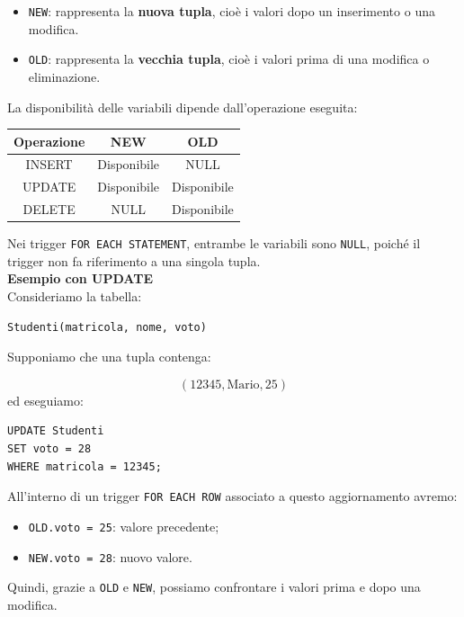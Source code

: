 \begin{itemize}
    \item \texttt{NEW}: rappresenta la \textbf{nuova tupla},
    cioè i valori dopo un inserimento o una modifica.

    \item \texttt{OLD}: rappresenta la \textbf{vecchia tupla},
    cioè i valori prima di una modifica o eliminazione.
\end{itemize}

\noindent
La disponibilità delle variabili dipende
dall'operazione eseguita:

\begin{center}
\begin{tabular}{|c|c|c|}
\hline
\textbf{Operazione} & \textbf{NEW} & \textbf{OLD} \\
\hline
INSERT & Disponibile & NULL \\
\hline
UPDATE & Disponibile & Disponibile \\
\hline
DELETE & NULL & Disponibile \\
\hline
\end{tabular}
\end{center}

\noindent
Nei trigger \texttt{FOR EACH STATEMENT},
entrambe le variabili sono \texttt{NULL},
poiché il trigger non fa riferimento
a una singola tupla.
\medskip\\
\textbf{Esempio con UPDATE}\\
Consideriamo la tabella:
\begin{verbatim}
Studenti(matricola, nome, voto)
\end{verbatim}
Supponiamo che una tupla contenga:

\[
(12345,\text{Mario},25)
\]
ed eseguiamo:

\begin{verbatim}
UPDATE Studenti
SET voto = 28
WHERE matricola = 12345;
\end{verbatim}
All'interno di un trigger \texttt{FOR EACH ROW}
associato a questo aggiornamento avremo:

\begin{itemize}
    \item \texttt{OLD.voto = 25}: valore precedente;
    \item \texttt{NEW.voto = 28}: nuovo valore.
\end{itemize}

\noindent
Quindi, grazie a \texttt{OLD} e \texttt{NEW},
possiamo confrontare i valori prima e dopo
una modifica.
